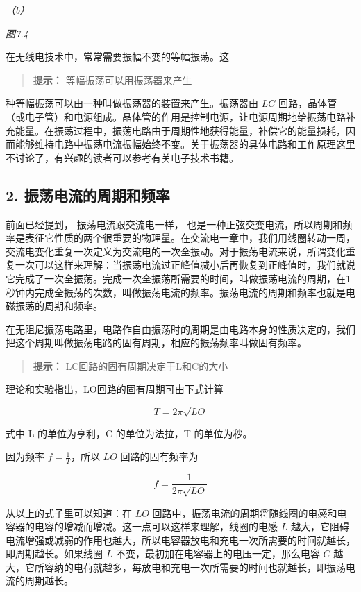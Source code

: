 \emph{（b）}

\emph{图7.4}

在无线电技术中，常常需要振幅不变的等幅振荡。这

\begin{quote}
\textbf{提示：} 等幅振荡可以用振荡器来产生
\end{quote}

种等幅振荡可以由一种叫做振荡器的装置来产生。振荡器由 \(LC\)
回路，晶体管（或电子管）和电源组成。晶体管的作用是控制电源，让电源周期地给振荡电路补充能量。在振荡过程中，振荡电路由于周期性地获得能量，补偿它的能量损耗，因而能够维持电路中振荡电流振幅始终不变。关于振荡器的具体电路和工作原理这里不讨论了，有兴趣的读者可以参考有关电子技术书籍。

\subsection{2.
振荡电流的周期和频率}\label{ux632fux8361ux7535ux6d41ux7684ux5468ux671fux548cux9891ux7387}

前面已经提到， 振荡电流跟交流电一样，
也是一种正弦交变电流，所以周期和频率是表征它性质的两个很重要的物理量。在交流电一章中，我们用线圈转动一周，交流电变化重复一次定义为交流电的一次全振动。对于振荡电流来说，所谓变化重复一次可以这样来理解：当振荡电流过正峰值减小后再恢复到正峰值时，我们就说它完成了一次全振荡。完成一次全振荡所需要的时间，叫做振荡电流的周期，在1秒钟内完成全振荡的次数，叫做振荡电流的频率。振荡电流的周期和频率也就是电磁振荡的周期和频率。

在无阻尼振荡电路里，电路作自由振荡时的周期是由电路本身的性质决定的，我们把这个周期叫做振荡电路的固有周期，相应的振荡频率叫做固有频率。

\begin{quote}
\textbf{提示：} LC回路的固有周期决定于L和C的大小
\end{quote}

理论和实验指出，LO回路的固有周期可由下式计算

\[
T = 2 \pi \sqrt{L O} \tag{7.1}
\]

式中 L 的单位为亨利，C 的单位为法拉，T 的单位为秒。

因为频率 \(f = \frac{1}{T}\)，所以 \(LO\) 回路的固有频率为

\[
f = \frac{1}{2 \pi \sqrt{L O}} \tag{7.2}
\]

从以上的式子里可以知道：在 \(LO\)
回路中，振荡电流的周期将随线圈的电感和电容器的电容的增减而增减。这一点可以这样来理解，线圈的电感
\(L\)
越大，它阻碍电流增强或减弱的作用也越大，所以电容器放电和充电一次所需要的时间就越长，即周期越长。如果线圈
\(L\) 不变，最初加在电容器上的电压一定，那么电容 \(C\)
越大，它所容纳的电荷就越多，每放电和充电一次所需要的时间也就越长，即振荡电流的周期越长。

